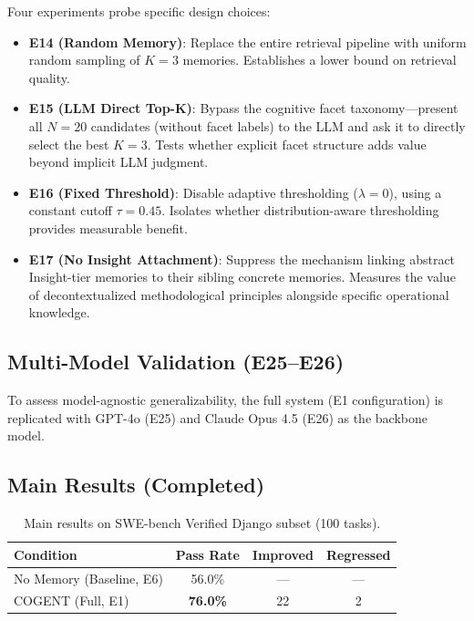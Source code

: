 \documentclass[letterpaper]{article} %
\begin{document}
Four experiments probe specific design choices:

\begin{itemize}
    \item \textbf{E14 (Random Memory)}: Replace the entire retrieval pipeline with uniform random sampling of $K=3$ memories. Establishes a lower bound on retrieval quality.
    \item \textbf{E15 (LLM Direct Top-K)}: Bypass the cognitive facet taxonomy---present all $N=20$ candidates (without facet labels) to the LLM and ask it to directly select the best $K=3$. Tests whether explicit facet structure adds value beyond implicit LLM judgment.
    \item \textbf{E16 (Fixed Threshold)}: Disable adaptive thresholding ($\lambda = 0$), using a constant cutoff $\tau = 0.45$. Isolates whether distribution-aware thresholding provides measurable benefit.
    \item \textbf{E17 (No Insight Attachment)}: Suppress the mechanism linking abstract Insight-tier memories to their sibling concrete memories. Measures the value of decontextualized methodological principles alongside specific operational knowledge.
\end{itemize}

\subsection{Multi-Model Validation (E25--E26)}

To assess model-agnostic generalizability, the full system (E1 configuration) is replicated with GPT-4o (E25) and Claude Opus 4.5 (E26) as the backbone model.

\subsection{Main Results (Completed)}

\begin{table}[t]
\centering
\caption{Main results on SWE-bench Verified Django subset (100 tasks).}
\label{tab:main-results}
\begin{tabular}{lccc}
\toprule
\textbf{Condition} & \textbf{Pass Rate} & \textbf{Improved} & \textbf{Regressed} \\
\midrule
No Memory (Baseline, E6) & 56.0\% & --- & --- \\
\textsc{COGENT} (Full, E1)  & \textbf{76.0\%} & 22 & 2 \\
\bottomrule
\end{tabular}
\end{table}
\end{document}
